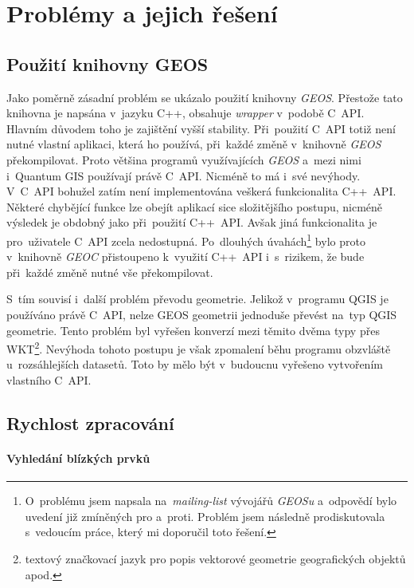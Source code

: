 \chapter{Problémy a jejich řešení}
\label{7-problemy}

\section{Použití knihovny GEOS}
\label{problemy-geos}
Jako poměrně zásadní problém se ukázalo použití knihovny \textit{GEOS}. 
Přestože tato knihovna je napsána v~jazyku C++, obsahuje \textit{wrapper} 
v~podobě C~API. Hlavním důvodem toho je zajištění vyšší 
stability. Při~použití C~API totiž není nutné vlastní aplikaci,
která ho používá, při~každé změně v~knihovně \textit{GEOS} překompilovat. 
Proto většina programů využívajících \textit{GEOS} a~mezi nimi i~Quantum 
GIS používají právě C~API. Nicméně to má i~své nevýhody. V~C~API bohužel 
zatím není implementována veškerá funkcionalita C++~API. Některé chybějící 
funkce lze obejít aplikací sice složitějšího postupu, nicméně výsledek je 
obdobný jako při~použití C++~API. Avšak jiná funkcionalita je pro~uživatele 
C~API zcela nedostupná. Po~dlouhých úvahách\footnote{O~problému jsem napsala
na~\textit{mailing-list} vývojářů \textit{GEOSu} a~odpovědí bylo uvedení 
již zmíněných pro a~proti. Problém jsem následně prodiskutovala s~vedoucím 
práce, který mi doporučil toto řešení.} bylo proto v~knihovně \textit{GEOC} 
přistoupeno k~využití C++~API i~s~rizikem, že bude při~každé změně nutné 
vše překompilovat. %

S~tím souvisí i~další problém převodu geometrie. Jelikož v~programu QGIS je 
používáno právě C~API, nelze GEOS geometrii jednoduše převést na~typ QGIS 
geometrie. Tento problém byl vyřešen konverzí mezi těmito dvěma typy přes 
WKT\footnote{textový značkovací jazyk pro popis vektorové 
geometrie geografických objektů apod.}. Nevýhoda tohoto postupu je však 
zpomalení běhu programu obzvláště u~rozsáhlejších datasetů. Toto by mělo
být v~budoucnu vyřešeno vytvořením vlastního C~API.


\section{Rychlost zpracování}
\label{problemy-rychlost}

\subsubsection{Vyhledání blízkých prvků}

